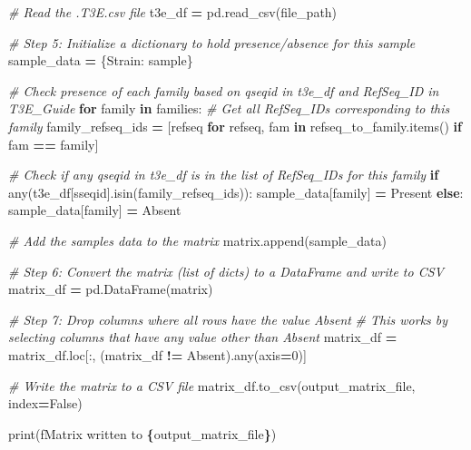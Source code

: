 \documentclass[
]{book}
\newenvironment{Shaded}{\begin{snugshade}}{\end{snugshade}}
\newcommand{\BuiltInTok}[1]{#1}
\newcommand{\CommentTok}[1]{\textcolor[rgb]{0.56,0.35,0.01}{\textit{#1}}}
\newcommand{\ControlFlowTok}[1]{\textcolor[rgb]{0.13,0.29,0.53}{\textbf{#1}}}
\newcommand{\DecValTok}[1]{\textcolor[rgb]{0.00,0.00,0.81}{#1}}
\newcommand{\KeywordTok}[1]{\textcolor[rgb]{0.13,0.29,0.53}{\textbf{#1}}}
\newcommand{\NormalTok}[1]{#1}
\newcommand{\OperatorTok}[1]{\textcolor[rgb]{0.81,0.36,0.00}{\textbf{#1}}}
\newcommand{\SpecialCharTok}[1]{\textcolor[rgb]{0.81,0.36,0.00}{\textbf{#1}}}
\newcommand{\SpecialStringTok}[1]{\textcolor[rgb]{0.31,0.60,0.02}{#1}}
\newcommand{\StringTok}[1]{\textcolor[rgb]{0.31,0.60,0.02}{#1}}
\newcommand{\VariableTok}[1]{\textcolor[rgb]{0.00,0.00,0.00}{#1}}
\begin{document}
\begin{Shaded}
\begin{Highlighting}[]
        \CommentTok{\# Read the .T3E.csv file}
\NormalTok{        t3e\_df }\OperatorTok{=}\NormalTok{ pd.read\_csv(file\_path)}
        
        \CommentTok{\# Step 5: Initialize a dictionary to hold presence/absence for this sample}
\NormalTok{        sample\_data }\OperatorTok{=}\NormalTok{ \{}\StringTok{\textquotesingle{}Strain\textquotesingle{}}\NormalTok{: sample\}}
        
        \CommentTok{\# Check presence of each family based on qseqid in t3e\_df and RefSeq\_ID in T3E\_Guide}
        \ControlFlowTok{for}\NormalTok{ family }\KeywordTok{in}\NormalTok{ families:}
            \CommentTok{\# Get all RefSeq\_IDs corresponding to this family}
\NormalTok{            family\_refseq\_ids }\OperatorTok{=}\NormalTok{ [refseq }\ControlFlowTok{for}\NormalTok{ refseq, fam }\KeywordTok{in}\NormalTok{ refseq\_to\_family.items() }\ControlFlowTok{if}\NormalTok{ fam }\OperatorTok{==}\NormalTok{ family]}
            
            \CommentTok{\# Check if any qseqid in t3e\_df is in the list of RefSeq\_IDs for this family}
            \ControlFlowTok{if} \BuiltInTok{any}\NormalTok{(t3e\_df[}\StringTok{\textquotesingle{}sseqid\textquotesingle{}}\NormalTok{].isin(family\_refseq\_ids)):}
\NormalTok{                sample\_data[family] }\OperatorTok{=} \StringTok{\textquotesingle{}Present\textquotesingle{}}
            \ControlFlowTok{else}\NormalTok{:}
\NormalTok{                sample\_data[family] }\OperatorTok{=} \StringTok{\textquotesingle{}Absent\textquotesingle{}}
        
        \CommentTok{\# Add the sample\textquotesingle{}s data to the matrix}
\NormalTok{        matrix.append(sample\_data)}

\CommentTok{\# Step 6: Convert the matrix (list of dicts) to a DataFrame and write to CSV}
\NormalTok{matrix\_df }\OperatorTok{=}\NormalTok{ pd.DataFrame(matrix)}

\CommentTok{\# Step 7: Drop columns where all rows have the value \textquotesingle{}Absent\textquotesingle{}}
\CommentTok{\# This works by selecting columns that have any value other than \textquotesingle{}Absent\textquotesingle{}}
\NormalTok{matrix\_df }\OperatorTok{=}\NormalTok{ matrix\_df.loc[:, (matrix\_df }\OperatorTok{!=} \StringTok{\textquotesingle{}Absent\textquotesingle{}}\NormalTok{).}\BuiltInTok{any}\NormalTok{(axis}\OperatorTok{=}\DecValTok{0}\NormalTok{)]}

\CommentTok{\# Write the matrix to a CSV file}
\NormalTok{matrix\_df.to\_csv(output\_matrix\_file, index}\OperatorTok{=}\VariableTok{False}\NormalTok{)}

\BuiltInTok{print}\NormalTok{(}\SpecialStringTok{f\textquotesingle{}Matrix written to }\SpecialCharTok{\{}\NormalTok{output\_matrix\_file}\SpecialCharTok{\}}\SpecialStringTok{\textquotesingle{}}\NormalTok{)}
\end{Highlighting}
\end{Shaded}
\end{document}
